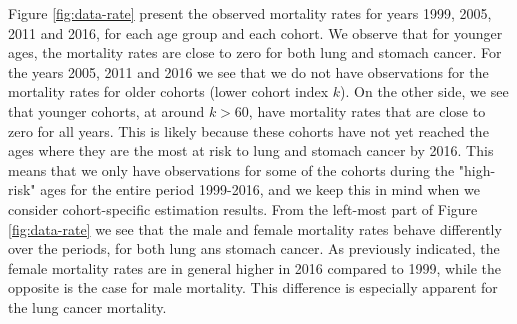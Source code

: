 Figure \ref{fig:data-rate} present the observed mortality rates for years 1999, 2005, 2011 and 2016, for each age group and each cohort. We observe that for younger ages, the mortality rates are close to zero for both lung and stomach cancer. For the years 2005, 2011 and 2016 we see that we do not have observations for the  mortality rates for older cohorts (lower cohort index $k$). On the other side, we see that younger cohorts, at around $k > 60$, have mortality rates that are close to zero for all years. This is likely because these cohorts have not yet reached the ages where they are the most at risk to lung and stomach cancer by 2016. This means that we only have observations for some of the cohorts during the "high-risk" ages for the entire period 1999-2016, and we keep this in mind when we consider cohort-specific estimation results. From the left-most part of Figure \ref{fig:data-rate} we see that the male and female mortality rates behave differently over the periods, for both lung ans stomach cancer. As previously indicated, the female mortality rates are in general higher in 2016 compared to 1999, while the opposite is the case for male mortality. This difference is especially apparent for the lung cancer mortality. 

